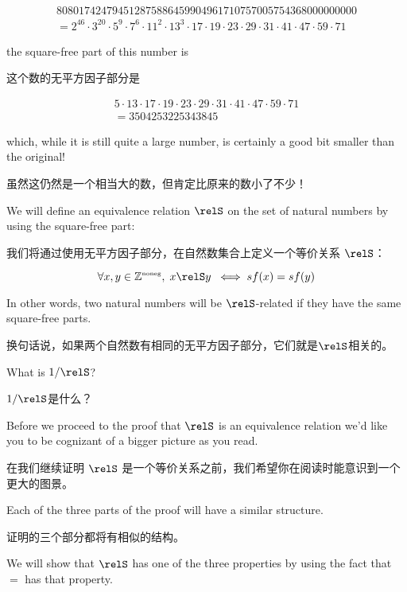 \begin{gather*} 
808017424794512875886459904961710757005754368000000000 \\ 
 = 2^{46}\cdot 3^{20}\cdot 5^9\cdot7^6\cdot 11^2\cdot 13^3\cdot 17
\cdot 19\cdot 23\cdot 29\cdot 31\cdot 41\cdot 47\cdot 59\cdot 71
\end{gather*}

\noindent the square-free part of this number is 

\noindent 这个数的无平方因子部分是

\begin{gather*} 
5\cdot 13\cdot 17\cdot 19\cdot 23\cdot 29\cdot 31\cdot 41\cdot 47\cdot 59\cdot 71\\
 = 3504253225343845
\end{gather*}

\noindent which, while it is still quite a large number, is certainly a good
bit smaller than the original!

\noindent 虽然这仍然是一个相当大的数，但肯定比原来的数小了不少！

We will define an equivalence relation $\relS$ on the set of natural numbers
by using the square-free part:  

我们将通过使用无平方因子部分，在自然数集合上定义一个等价关系 $\relS$：

\[ \forall x, y \in \Naturals, \;
x \relS y \; \iff sf(x) = sf(y) \]

In other words, two natural numbers will be $\relS$-related if they have the
same square-free parts.

换句话说，如果两个自然数有相同的无平方因子部分，它们就是$\relS$相关的。

\begin{exer}
What is $1/\relS$?
\end{exer}

\begin{exer}
$1/\relS$是什么？
\end{exer}

Before we proceed to the proof that $\relS$ is an equivalence relation we'd like 
you to be cognizant of a bigger picture as you read.

在我们继续证明 $\relS$ 是一个等价关系之前，我们希望你在阅读时能意识到一个更大的图景。

Each of the three parts of
the proof will have a similar structure.

证明的三个部分都将有相似的结构。

We will show that $\relS$ has one of the 
three properties by using the fact that $=$ has that property.

